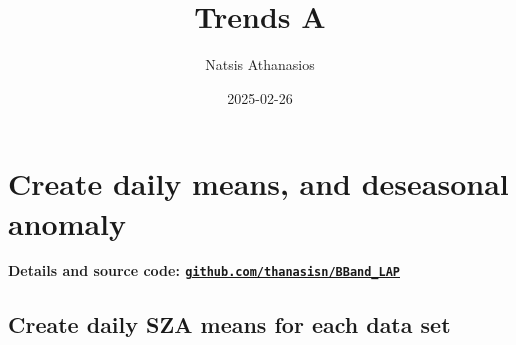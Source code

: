 \documentclass[
  10pt,
  a4paper,oneside]{article}
\title{Trends A}
\author{Natsis Athanasios}
\date{2025-02-26}
\begin{document}
\maketitle

{
\hypersetup{linkcolor=}
\setcounter{tocdepth}{4}
\tableofcontents
}
\hypertarget{create-daily-means-and-deseasonal-anomaly}{%
\section{Create daily means, and deseasonal anomaly}\label{create-daily-means-and-deseasonal-anomaly}}

\textbf{Details and source code: \href{https://github.com/thanasisn/BBand_LAP}{\texttt{github.com/thanasisn/BBand\_LAP}}}

\FloatBarrier
\newpage

\hypertarget{create-daily-sza-means-for-each-data-set}{%
\subsection{Create daily SZA means for each data set}\label{create-daily-sza-means-for-each-data-set}}
\end{document}
